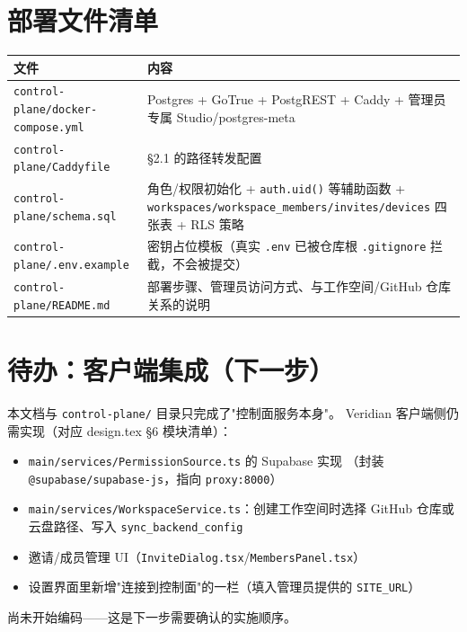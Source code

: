 \documentclass[12pt, a4paper]{article}
\begin{document}
\section{部署文件清单}

\begin{center}
\begin{tabular}{p{3.6cm} p{8.9cm}}
  \toprule
  \textbf{文件} & \textbf{内容} \\
  \midrule
  \texttt{control-plane/docker-compose.yml} & Postgres + GoTrue + PostgREST + Caddy + 管理员专属 Studio/postgres-meta \\
  \texttt{control-plane/Caddyfile} & \S2.1 的路径转发配置 \\
  \texttt{control-plane/schema.sql} & 角色/权限初始化 + \texttt{auth.uid()} 等辅助函数 +
    \texttt{workspaces/workspace\_members/invites/devices} 四张表 + RLS 策略 \\
  \texttt{control-plane/.env.example} & 密钥占位模板（真实 \texttt{.env} 已被仓库根 \texttt{.gitignore} 拦截，不会被提交） \\
  \texttt{control-plane/README.md} & 部署步骤、管理员访问方式、与工作空间/GitHub 仓库关系的说明 \\
  \bottomrule
\end{tabular}
\end{center}

\section{待办：客户端集成（下一步）}

本文档与 \texttt{control-plane/} 目录只完成了"控制面服务本身"。
Veridian 客户端侧仍需实现（对应 design.tex \S6 模块清单）：

\begin{itemize}[leftmargin=2em, itemsep=2pt]
  \item \texttt{main/services/PermissionSource.ts} 的 Supabase 实现
        （封装 \texttt{@supabase/supabase-js}，指向 \texttt{proxy:8000}）
  \item \texttt{main/services/WorkspaceService.ts}：创建工作空间时选择
        GitHub 仓库或云盘路径、写入 \texttt{sync\_backend\_config}
  \item 邀请/成员管理 UI（\texttt{InviteDialog.tsx}/\texttt{MembersPanel.tsx}）
  \item 设置界面里新增"连接到控制面"的一栏（填入管理员提供的 \texttt{SITE\_URL}）
\end{itemize}

尚未开始编码——这是下一步需要确认的实施顺序。
\end{document}
